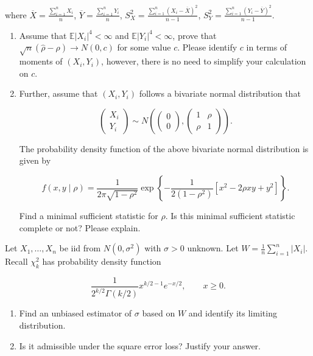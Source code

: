 \documentclass[11pt,a4paper]{article}
\newcommand{\examstatement}[1]{%
  \par\addvspace{0.85em}%
  \noindent{\bfseries #1}\par\nobreak\addvspace{0.28em}%
}
\begin{document}
where \( \overline{X} = \frac{\sum_{i=1}^n X_i}{n} \), \( \overline{Y} = \frac{\sum_{i=1}^n Y_i}{n} \), \( S_X^2 = \frac{\sum_{i=1}^n (X_i - \overline{X})^2}{n-1} \), \( S_Y^2 = \frac{\sum_{i=1}^n (Y_i - \overline{Y})^2}{n-1} \).
\begin{enumerate}[label=(\alph*)]
    \item Assume that \( \mathbb{E}|X_i|^4 < \infty \) and \( \mathbb{E}|Y_i|^4 < \infty \), prove that \( \sqrt{n}(\hat{\rho} - \rho) \longrightarrow N(0, c) \) for some value \( c \). Please identify \( c \) in terms of moments of \( (X_i, Y_i) \), however, there is no need to simplify your calculation on \( c \).
    \item Further, assume that \( (X_i, Y_i) \) follows a bivariate normal distribution that

    \[
    \begin{pmatrix} X_i \\ Y_i \end{pmatrix}
    \sim
    N\left(
    \begin{pmatrix} 0 \\ 0 \end{pmatrix},
    \begin{pmatrix} 1 & \rho \\ \rho & 1 \end{pmatrix}
    \right).
    \]

    The probability density function of the above bivariate normal distribution is given by

    \[
    f(x, y \mid \rho) = \frac{1}{2\pi \sqrt{1 - \rho^2}} \exp\left\{ -\frac{1}{2(1 - \rho^2)} [x^2 - 2\rho xy + y^2] \right\}.
    \]

    Find a minimal sufficient statistic for \( \rho \). Is this minimal sufficient statistic complete or not? Please explain.
\end{enumerate}

\examstatement{Problem 10. [10 pts.]}
Let \( X_1, \dots, X_n \) be iid from \( N(0, \sigma^2) \) with \( \sigma > 0 \) unknown. Let \( W = \frac{1}{n} \sum_{i=1}^n |X_i| \). Recall \( \chi^2_k \) has probability density function

\[
\frac{1}{2^{k/2} \Gamma(k/2)} x^{k/2 - 1} e^{-x/2}, \qquad x \ge 0.
\]

\begin{enumerate}[label=(\alph*)]
    \item Find an unbiased estimator of \( \sigma \) based on \( W \) and identify its limiting distribution.
    \item Is it admissible under the square error loss? Justify your answer.
\end{enumerate}
\end{document}
